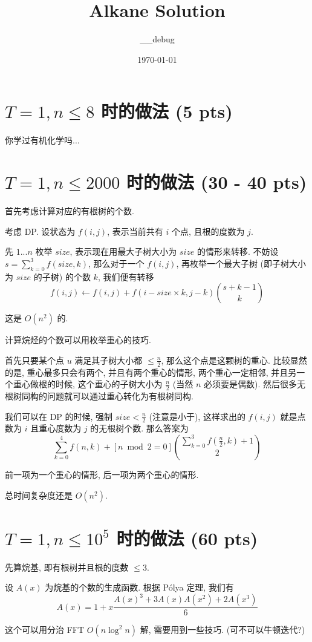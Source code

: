 \documentclass[a4paper]{article}
\date{\today}
\title{Alkane Solution}
\author{\_\_debug}
\begin{document}
\maketitle

\section{$T = 1, n \le 8$ 时的做法 (5 pts)}
你学过有机化学吗...

\section{$T = 1, n \le 2000$ 时的做法 (30 - 40 pts)}
首先考虑计算对应的有根树的个数.

考虑 DP.
设状态为 $f(i, j)$, 表示当前共有 $i$ 个点, 且根的度数为 $j$.

先 $1 ... n$ 枚举 $size$, 表示现在用最大子树大小为 $size$ 的情形来转移.
不妨设 $s = \sum_{k = 0}^{3} f(size, k)$, 那么对于一个 $f(i, j)$, 再枚举一个最大子树 (即子树大小为 $size$ 的子树) 的个数 $k$, 我们便有转移
$$f(i, j) \leftarrow f(i, j) + f(i - size \times k, j - k) \binom{s + k - 1}{k}$$

这是 $O(n^2)$ 的.
\bigskip

计算烷烃的个数可以用枚举重心的技巧.

首先只要某个点 $u$ 满足其子树大小都 $\leq \frac{n}{2}$, 那么这个点是这颗树的重心.
比较显然的是, 重心最多只会有两个, 并且有两个重心的情形, 两个重心一定相邻, 并且另一个重心做根的时候, 这个重心的子树大小为 $\frac{n}{2}$ (当然 $n$ 必须要是偶数).
然后很多无根树同构的问题就可以通过重心转化为有根树同构.

我们可以在 DP 的时候, 强制 $size < \frac{n}{2}$ (注意是小于), 这样求出的 $f(i, j)$ 就是点数为 $i$ 且重心度数为 $j$ 的无根树个数.
那么答案为
$$\sum_{k = 0}^{4} f(n, k) + [n \bmod 2 = 0] \binom{\sum_{k = 0}^{3} f(\frac{n}{2}, k) + 1}{2}$$

前一项为一个重心的情形, 后一项为两个重心的情形.

总时间复杂度还是 $O(n^2)$.

\section{$T = 1, n \le 10^5$ 时的做法 (60 pts)}
先算烷基, 即有根树并且根的度数 $\le 3$.

设 $A(x)$ 为烷基的个数的生成函数.
根据 Pólya 定理, 我们有
$$A(x) = 1 + x \frac{A(x)^3 + 3A(x)A(x^2) + 2A(x^3)}{6}$$

这个可以用分治 FFT $O(n \log^2 n)$ 解, 需要用到一些技巧.
(可不可以牛顿迭代?)
\end{document}
